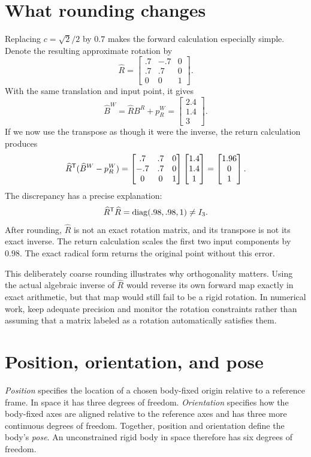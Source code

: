 \section{What rounding changes}
Replacing $c=\sqrt2/2$ by $0.7$ makes the forward calculation especially
simple. Denote the resulting approximate rotation by
\[
 \widehat R=\begin{bmatrix}.7&-.7&0\\.7&.7&0\\0&0&1\end{bmatrix}.
\]
With the same translation and input point, it gives
\[
 \widehat B^W=\widehat R B^R+p_R^W
 =\begin{bmatrix}2.4\\1.4\\3\end{bmatrix}.
\]
If we now use the transpose as though it were the inverse, the return
calculation produces
\[
 \widehat R^{\mathsf T}(\widehat B^W-p_R^W)
 =\begin{bmatrix}.7&.7&0\\-.7&.7&0\\0&0&1\end{bmatrix}
 \begin{bmatrix}1.4\\1.4\\1\end{bmatrix}
 =\begin{bmatrix}1.96\\0\\1\end{bmatrix}.
\]
The discrepancy has a precise explanation:
\begin{equation}
 \widehat R^{\mathsf T}\widehat R=\operatorname{diag}(.98,.98,1)\ne I_3.
 \label{eq:l05-roundoff}
\end{equation}
After rounding, $\widehat R$ is not an exact rotation matrix, and its transpose
is not its exact inverse. The return calculation scales the first two input
components by $0.98$. The exact radical form returns the original point
without this error.

This deliberately coarse rounding illustrates why orthogonality matters.
Using the actual algebraic inverse of $\widehat R$ would reverse its own
forward map exactly in exact arithmetic, but that map would still fail to be
a rigid rotation. In numerical work, keep adequate precision and monitor the
rotation constraints rather than assuming that a matrix labeled as a rotation
automatically satisfies them.

\section{Position, orientation, and pose}
\emph{Position} specifies the location of a chosen body-fixed origin relative
to a reference frame. In space it has three degrees of freedom.
\emph{Orientation} specifies how the body-fixed axes are aligned relative
to the reference axes and has three more continuous degrees of freedom.
Together, position and orientation define the body's \emph{pose}.
An unconstrained rigid body in space therefore has six degrees of freedom.

